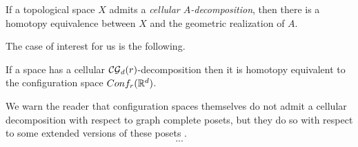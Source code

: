 \begin{proposition}
	If a topological space $X$ admits a \textit{cellular $A$-decomposition}, then there is a homotopy equivalence between $X$ and the geometric realization of $A$.
\end{proposition}

The case of interest for us is the following.

\begin{proposition}\label{p:berger}
	If a space has a cellular $\mathcal{CG}_d(r)$-decomposition then it is homotopy equivalent to
	the configuration space
	$Conf_{r}(\mathbb{R}^{d})$.
\end{proposition}

We warn the reader that configuration spaces themselves do not admit a cellular decomposition with respect to graph complete posets, but they do so with respect to some extended versions of these posets \cite{beuckelmann2021master}.
\begin{equation}\label{eq:extended complete graph map}
	...
\end{equation}
